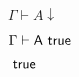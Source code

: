 \documentclass[10pt]{book}
\begin{document}
\begin{mdSnippets}
\begin{mdInlineSnippet}[3bb34b587512c0a57f85c4f812c84fca]%
$\Gamma\vdash A\downarrow $\end{mdInlineSnippet}%
\begin{mdInlineSnippet}[ab34257847a10c9369180cb40ab0e74d]%
$\Gamma \vdash {\sf A\  true}$\end{mdInlineSnippet}%
\begin{mdInlineSnippet}[3fbc2702e7a2052c63d8db66ee4895a4]%
${\sf \ true}$\end{mdInlineSnippet}%

\end{mdSnippets}
\end{document}
